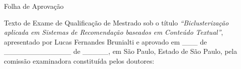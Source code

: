 \documentclass[normaltoc, espacoumemeio, pnumromarab,ruledheader]{abnt}
\begin{document}
\begin{folhadeaprovacao}
\pretextualchapter{}
\begin{center}
Folha de Aprovação
\end{center}

\noindent Texto de Exame de Qualificação de Mestrado sob o título \textit{\textquotedblleft Biclusterização aplicada em Sistemas de Recomendação baseados em Conteúdo Textual\textquotedblright}, apresentado por Lucas Fernandes Brunialti e aprovado em \_\_\_ de \_\_\_\_\_\_\_\_\_\_\_\_\_ de \_\_\_\_\_, em São Paulo, Estado de São Paulo, pela comissão examinadora constituída pelos doutores: %

%


\end{folhadeaprovacao}



    
\end{document}
